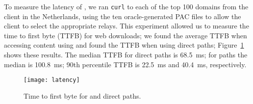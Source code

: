 To measure the latency of \system{}, we ran {\tt curl} to each of the  top 100
domains from the client in the Netherlands, using the ten oracle-generated PAC
files to allow the client to select the appropriate relays. This experiment
allowed us to measure the time to first byte (TTFB) for web downloads; we
found the average TTFB when accessing content using \system{} and  found the
TTFB when using direct paths; 
Figure~\ref{fig:latency} shows these results. The median TTFB for direct paths is
68.5~ms; for
\system{} paths the median is 100.8~ms; 90th percentile TTFB is 22.5~ms and
40.4~ms, respectively.


\begin{figure}[t]
\centering
\texttt{[image: latency]}
\caption{Time to first byte for \system{} and direct paths.}
\label{fig:latency}
\end{figure}




